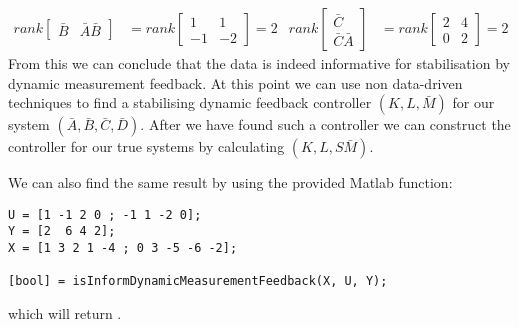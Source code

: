 \begin{align*}
rank\begin{bmatrix} \bar{B}&\bar{A}\bar{B} \end{bmatrix} &= rank\begin{bmatrix} 1&1\\-1&-2 \end{bmatrix} =2 &
rank\begin{bmatrix} \bar{C}\\\bar{C}\bar{A} \end{bmatrix} &= rank\begin{bmatrix} 2&4\\0&2 \end{bmatrix} = 2
\end{align*}
From this we can conclude that the data is indeed informative for stabilisation by dynamic measurement feedback. At this point we can use non data-driven techniques to find a stabilising dynamic feedback controller $(K,L,\bar{M})$ for our system $(\bar{A},\bar{B},\bar{C},\bar{D})$. After we have found such a controller we can construct the controller for our true systems by calculating $(K,L,S\bar{M})$.

We can also find the same result by using the provided Matlab function:
\begin{lstlisting}
U = [1 -1 2 0 ; -1 1 -2 0];
Y = [2  6 4 2];
X = [1 3 2 1 -4 ; 0 3 -5 -6 -2];

[bool] = isInformDynamicMeasurementFeedback(X, U, Y);
\end{lstlisting}
which will return \mon{[ 1 ]}.








